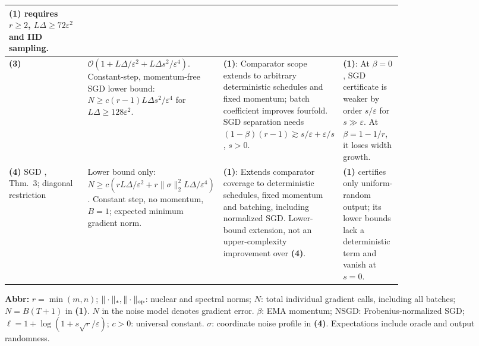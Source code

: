 \begin{table}[tp]
\begin{threeparttable}
\begin{tabularx}{\linewidth}{@{}>{\raggedright\arraybackslash}p{0.20\linewidth}>{\raggedright\arraybackslash}p{0.32\linewidth}>{\raggedright\arraybackslash}p{0.25\linewidth}>{\raggedright\arraybackslash}X@{}}
\textbf{(1)} requires $r\ge2$, $L\Delta\ge72\varepsilon^2$ and IID sampling. \\
\midrule
\textbf{(3)} \citep{ssacMuonRepository,ssacSgdRepository} &
$\mathcal{O}(1+L\Delta/\varepsilon^2+L\Delta s^2/\varepsilon^4)$.
Constant-step, momentum-free SGD lower bound: $N\ge c(r-1)L\Delta s^2/\varepsilon^4$ for $L\Delta\ge128\varepsilon^2$. &
\textbf{(1)}: Comparator scope extends to arbitrary deterministic schedules and fixed momentum; batch coefficient improves fourfold. SGD separation needs $(1-\beta)(r-1)\gtrsim s/\varepsilon+\varepsilon/s$, $s>0$. &
\textbf{(1)}: At $\beta=0$, SGD certificate is weaker by order $s/\varepsilon$ for $s\gg\varepsilon$. At $\beta=1-1/r$, it loses width growth. \\
\midrule
\textbf{(4)} SGD \citep{smcTYZ2026v1}, Thm.~3; diagonal restriction &
Lower bound only: $N\ge c(rL\Delta/\varepsilon^2+r\|\sigma\|_2^2L\Delta/\varepsilon^4)$.
Constant step, no momentum, $B=1$; expected minimum gradient norm. &
\textbf{(1)}: Extends comparator coverage to deterministic schedules, fixed momentum and batching, including normalized SGD. Lower-bound extension, not an upper-complexity improvement over \textbf{(4)}. &
\textbf{(1)} certifies only uniform-random output; its lower bounds lack a deterministic term and vanish at $s=0$. \\
\bottomrule
\end{tabularx}
\begin{tablenotes}[flushleft]\footnotesize
\item[] \textbf{Abbr:} $r=\min(m,n)$; $\|\cdot\|_*,\|\cdot\|_{\rm op}$: nuclear and spectral norms; $N$: total individual gradient calls, including all batches; $N= B(T+1)$ in \textbf{(1)}. $N$ in the noise model denotes gradient error. $\beta$: EMA momentum; NSGD: Frobenius-normalized SGD; $\ell=1+\log(1+s\sqrt r/\varepsilon)$; $c>0$: universal constant. $\sigma$: coordinate noise profile in \textbf{(4)}. Expectations include oracle and output randomness.
\end{tablenotes}
\end{threeparttable}
\end{table}
\clearpage
